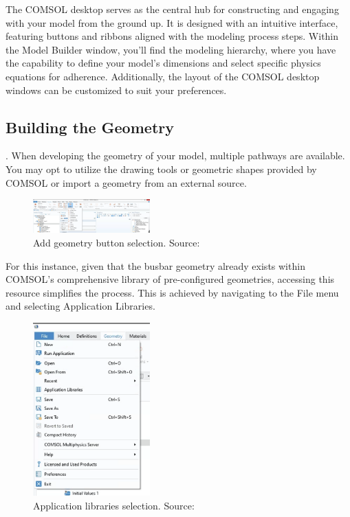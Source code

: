 The COMSOL desktop serves as the central hub for constructing and engaging with your model from the ground up. It is designed with an intuitive interface, featuring buttons and ribbons aligned with the modeling process steps. Within the Model Builder window, you'll find the modeling hierarchy, where you have the capability to define your model's dimensions and select specific physics equations for adherence. Additionally, the layout of the COMSOL desktop windows can be customized to suit your preferences.

\subsection{Building the Geometry}.
When developing the geometry of your model, multiple pathways are available. You may opt to utilize the drawing tools or geometric shapes provided by COMSOL or import a geometry from an external source.

\begin{figure}[ht!]
  \centering
  \includegraphics[width=0.4\textwidth]{Chapters/Figures/Chapter 3 Figures/Geometry Tab.png}
  \caption{Add geometry button selection. Source: \cite{multiphysics__modeling_nodate}}
  \label{fig:Add geometry button selection.}
\end{figure}

For this instance, given that the busbar geometry already exists within COMSOL's comprehensive library of pre-configured geometries, accessing this resource simplifies the process. This is achieved by navigating to the File menu and selecting Application Libraries.

\begin{figure}[ht!]
  \centering
  \includegraphics[width=0.4\textwidth]{Chapters/Figures/Chapter 3 Figures/Application Libraries Button.png}
  \caption{Application libraries selection. Source: \cite{multiphysics__modeling_nodate}}
  \label{fig:"application libraries" selection}
\end{figure}


